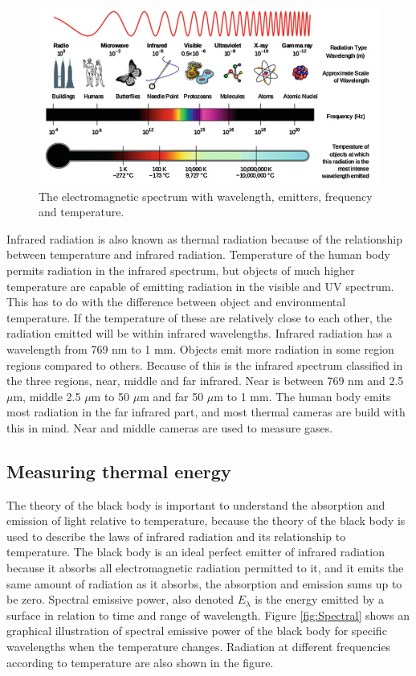 \begin{figure}[H]                                         
	\includegraphics[width=.66\textwidth]{figures/em_spectrum}  
	\caption{The electromagnetic spectrum with wavelength, emitters, frequency and temperature.\cite{ignacio2017}}
	\label{fig:em_spectrum}  
\end{figure}   

Infrared radiation is also known as thermal radiation because of the relationship between temperature and infrared radiation. Temperature of the human body permits radiation in the infrared spectrum, but objects of much higher temperature are capable of emitting radiation in the visible and UV spectrum. This has to do with the difference between object and environmental temperature. If the temperature of these are relatively close to each other, the radiation emitted will be within infrared wavelengths. Infrared radiation has a wavelength from 769 nm to 1 mm. Objects emit more radiation in some region regions compared to others. Because of this is the infrared spectrum classified in the three regions, near, middle and far infrared. Near is between 769 nm and 2.5 $\mu$m, middle 2.5 $\mu$m to 50 $\mu$m and far 50 $\mu$m to 1 mm. The human body emits most radiation in the far infrared part, and most thermal cameras are build with this in mind. Near and middle cameras are used to measure gases.\cite{ignacio2017} 


\subsection{Measuring thermal energy}

The theory of the black body is important to understand the absorption and emission of light relative to temperature, because the theory of the black body is used to describe the laws of infrared radiation and its relationship to temperature. The black body is an ideal perfect emitter of infrared radiation because it absorbs all electromagnetic radiation permitted to it, and it emits the same amount of radiation as it absorbs, the absorption and emission sums up to be zero. 
Spectral emissive power, also denoted $E_\lambda$ is the energy emitted by a surface in relation to time and range of wavelength. Figure \ref{fig:Spectral} shows an graphical illustration of spectral emissive power of the black body for specific wavelengths when the temperature changes. Radiation at different frequencies according to temperature are also shown in the figure.\cite{ignacio2017} 

